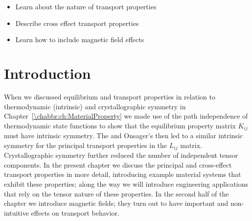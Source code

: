 \begin{learningobjectives}
{\begin{itemize}
    \item[{\color{OCBurntOrange}\ref{\chabbr:sec:TransportIntroduction}:}] Learn about the nature of transport properties
    \item[{\color{OCBurntOrange}\ref{\chabbr:sec:PCtransport}:}]  Describe cross effect transport properties
    \item[{\color{OCBurntOrange}\ref{\chabbr:sec:galvano}:}]  Learn how to include magnetic field effects
\end{itemize}}
\end{learningobjectives}

\section{Introduction}\label{\chabbr:sec:TransportIntroduction}

When we discussed equilibrium and transport properties in relation to thermodynamic (intrinsic) and crystallographic symmetry in Chapter~\ref{\chabbr:ch:MaterialProperty} we made use of the path independence of thermodynamic state functions to show that the equilibrium property matrix $K_{ij}$ must have intrinsic symmetry.  The  and Onsager's  then led to a similar intrinsic symmetry for the principal transport properties in the $L_{ij}$ matrix. Crystallographic symmetry further reduced the number of independent tensor components.  In the present chapter we discuss the principal and cross-effect transport properties in more detail, introducing example material systems that exhibit these properties; along the way we will introduce engineering applications that rely on the tensor nature of these properties.  In the second half of the chapter we introduce magnetic fields; they turn out to have important and non-intuitive effects on transport behavior.


